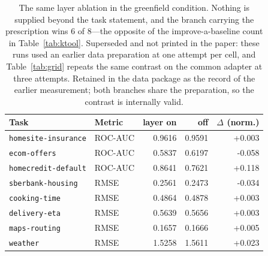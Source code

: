 \begin{table}[t]
\centering
\caption{The same layer ablation in the greenfield condition. Nothing is supplied beyond the task statement, and the branch carrying the prescription wins 6 of 8---the opposite of the improve-a-baseline count in Table~\ref{tab:ktool}. Superseded and not printed in the paper: these runs used an earlier data preparation at one attempt per cell, and Table~\ref{tab:grid} repeats the same contrast on the common adapter at three attempts. Retained in the data package as the record of the earlier measurement; both branches share the preparation, so the contrast is internally valid.}
\label{tab:greenfield}
\small
\begin{tabular}{llrrr}
\toprule
Task & Metric & layer on & off & $\Delta$ (norm.) \\
\midrule
\texttt{homesite-insurance} & ROC-AUC & 0.9616 & 0.9591 & +0.003 \\
\texttt{ecom-offers} & ROC-AUC & 0.5837 & 0.6197 & -0.058 \\
\texttt{homecredit-default} & ROC-AUC & 0.8641 & 0.7621 & +0.118 \\
\texttt{sberbank-housing} & RMSE & 0.2561 & 0.2473 & -0.034 \\
\texttt{cooking-time} & RMSE & 0.4864 & 0.4878 & +0.003 \\
\texttt{delivery-eta} & RMSE & 0.5639 & 0.5656 & +0.003 \\
\texttt{maps-routing} & RMSE & 0.1657 & 0.1666 & +0.005 \\
\texttt{weather} & RMSE & 1.5258 & 1.5611 & +0.023 \\
\bottomrule
\end{tabular}
\end{table}

